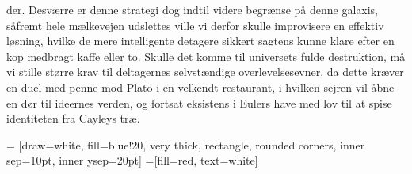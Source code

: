 \begin{minipage}[b]{0.95\linewidth}
\begin{minipage}[t]{0.47\textwidth}
der. Desværre er denne strategi dog indtil videre begrænse på denne galaxis, såfremt hele mælkevejen udslettes ville vi derfor skulle improvisere en effektiv løsning, hvilke de mere intelligente detagere sikkert sagtens kunne klare efter en kop medbragt kaffe eller to. Skulle det komme til universets fulde destruktion, må vi stille større krav til deltagernes selvstændige overlevelsesevner, da dette kræver en duel med penne mod Plato i en velkendt restaurant, i hvilken sejren vil åbne en dør til ideernes verden, og fortsat eksistens i Eulers have med lov til at spise identiteten fra Cayleys træ.


\end{minipage}
\hfill\begin{minipage}[t]{0.47\textwidth}

\vspace{1mm}
 = [draw=white, fill=blue!20, very thick,
    rectangle, rounded corners, inner sep=10pt, inner ysep=20pt]
 =[fill=red, text=white]

%
\vspace{2mm}



\end{minipage}
\end{minipage}
